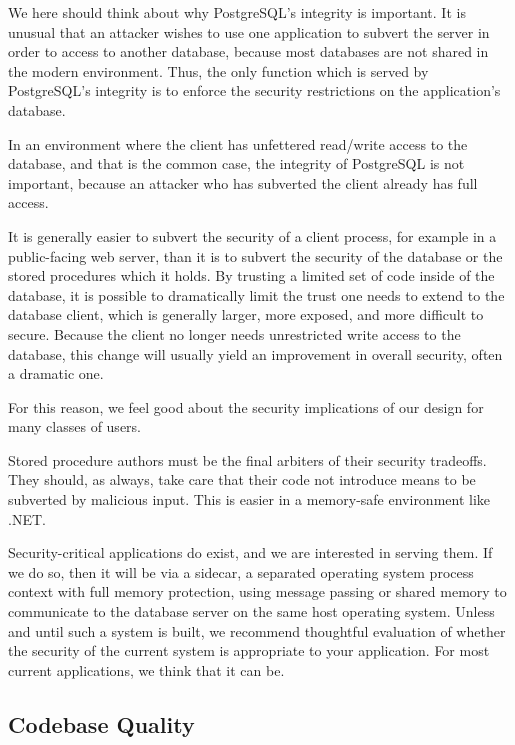 \documentclass[sigconf,techreport,authorversion,nonacm]{acmart}
\newcommand{\dotnet}{.NET}
\begin{document}
We here should think about why PostgreSQL's integrity is important.
It is unusual that an attacker wishes to use one application to subvert
the server in order to access to another database, because
most databases are not shared in the modern environment. Thus, the
only function which is served by PostgreSQL's integrity is to
enforce the security restrictions on the application's database.

In an environment where the client has unfettered read/write access
to the database, and that is the common case, the integrity of
PostgreSQL is not important, because an attacker who has subverted
the client already has full access.

It is generally easier to subvert the security of a client process,
for example in a public-facing web server, than it is to subvert
the security of the database or the stored procedures which it
holds. By trusting a limited set of code inside of the database,
it is possible to dramatically limit the trust one needs to extend
to the database client, which is generally larger, more exposed,
and more difficult to secure. Because the client no longer needs
unrestricted write access to the database, this change will usually
yield an improvement in overall security, often a dramatic one.

For this reason, we feel good about the security implications of
our design for many classes of users.

Stored procedure authors must be the final arbiters of their security
tradeoffs. They should, as always, take care that their code not
introduce means to be subverted by malicious input. This is easier
in a memory-safe environment like \dotnet.

Security-critical applications do exist, and we are interested in
serving them. If we do so, then it will be via a sidecar, a separated
operating system process context with full memory protection, using
message passing or shared memory to communicate to the database
server on the same host operating system. Unless and until such a
system is built, we recommend thoughtful evaluation of whether the
security of the current system is appropriate to your application.
For most current applications, we think that it can be.

\subsection{Codebase Quality}
\end{document}
